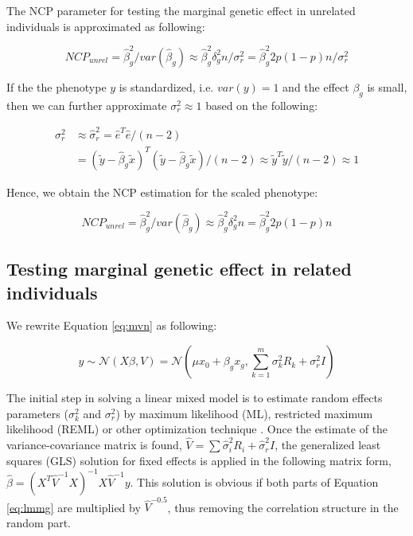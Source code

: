 \documentclass[]{book}
\begin{document}
The NCP parameter for testing the marginal genetic effect in unrelated
individuals is approximated as following:

\begin{equation}
NCP_{unrel} = \hat{\beta}_g^2 / var(\hat{\beta}_g) \approx \hat{\beta}_g^2 \delta_g^2 n / \sigma_r^2 = \hat{\beta}_g^2 2 p (1 - p) n / \sigma_r^2
\label{eq:ncplmg}
\end{equation}

If the the phenotype \(y\) is standardized, i.e. \(var(y) = 1\) and the
effect \(\beta_g\) is small, then we can further approximate
\(\sigma_r^2 \approx 1\) based on the following:

\begin{equation}
\begin{split}
\sigma^2_r & \approx \hat{\sigma}^2_r = \hat{e}^T \hat{e} / (n - 2) \\
& = (\tilde{y} - \hat{\beta}_g \tilde{x})^T (\tilde{y} - \hat{\beta}_g \tilde{x}) / (n - 2) \approx \tilde{y}^T \tilde{y} / (n - 2) \approx 1
\end{split}
\label{eq:sigma2r}
\end{equation}

Hence, we obtain the NCP estimation for the scaled phenotype:

\begin{equation}
NCP_{unrel} = \hat{\beta}_g^2 / var(\hat{\beta}_g) \approx \hat{\beta}_g^2 \delta_g^2 n  = \hat{\beta}_g^2 2 p (1 - p) n
\label{eq:ncplmg}
\end{equation}

\subsection{Testing marginal genetic effect in related
individuals}\label{lmmg}

We rewrite Equation \eqref{eq:mvn} as following:

\begin{equation}
  y \sim \mathcal{N} (X \beta, V) = \mathcal{N} (\mu x_0 + \beta_g x_g, \sum_{k=1}^{m}{\sigma_k^2 R_k} + \sigma_r^2 I) 
\label{eq:lmmg}
\end{equation}

The initial step in solving a linear mixed model is to estimate random
effects parameters (\(\sigma_k^2\) and \(\sigma_r^2\)) by maximum
likelihood (ML), restricted maximum likelihood (REML) or other
optimization technique \citep{Lynch1998}. Once the estimate of the
variance-covariance matrix is found,
\(\hat{V} = \sum{\hat{\sigma}_i^2 R_i} + \hat{\sigma}_r^2 I\), the
generalized least squares (GLS) solution for fixed effects is applied in
the following matrix form,
\(\hat{\beta} = \left(X^T \hat{V}^{-1} X\right)^{-1} X \hat{V}^{-1} y\).
This solution is obvious if both parts of Equation \eqref{eq:lmmg} are
multiplied by \(\hat{V}^{-0.5}\), thus removing the correlation
structure in the random part.
\end{document}

